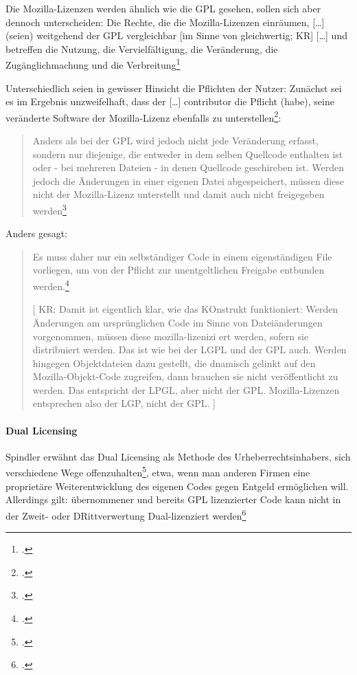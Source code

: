 \documentclass[DIV=calc,BCOR=5mm,11pt,headings=small,oneside,abstract=true, toc=bib]{scrartcl}
\begin{document}
Die Mozilla-Lizenzen werden ähnlich wie die GPL gesehen, sollen sich aber
dennoch unterscheiden: Die Rechte, die die Mozilla-Lizenzen einräumen,
\glqq{}[\ldots] (seien) weitgehend der GPL vergleichbar [im Sinne von
gleichwertig; KR] [\ldots]\grqq{} und betreffen die \glqq{}Nutzung\grqq{},
die \glqq{}Vervielfältigung\grqq{}, die \glqq{}Veränderung\grqq{}, die
\glqq{}Zugänglichmachung\grqq{} und die
\glqq{}Verbreitung\grqq{}\footcite[vgl.][14]{Spindler2004a}

Unterschiedlich seien in gewisser Hinsicht die Pflichten der Nutzer: Zunächst
sei es \glqq{}im Ergebnis unzweifelhaft\grqq{}, dass der \glqq{}[\ldots]
contributor die Pflicht (habe), seine veränderte Software der
Mozilla-Lizenz ebenfalls zu
unterstellen\grqq{}\footcite[vgl.][15]{Spindler2004a}:
\begin{quote}\glqq{}Anders als bei der GPL wird jedoch nicht jede
Veränderung erfasst, sondern nur diejenige, die entweder in dem selben
Quellcode enthalten ist oder - bei mehreren Dateien - in denen Quellcode
geschireben ist. Werden jedoch die Änderungen in einer eigenen Datei
abgespeichert, müssen diese nicht der Mozilla-Lizenz unterstellt und
damit auch nicht freigegeben werden\grqq{}\footcite[][15]{Spindler2004a}
\end{quote}

Anders gesagt:

\begin{quote}\glqq{}Es muss daher nur ein selbständiger Code in einem
eigenständigen File vorliegen, um von der Pflicht zur unentgeltlichen
Freigabe entbunden werden.\grqq{}\footcite[][15]{Spindler2004a}

[ KR: Damit ist eigentlich klar, wie das KOnstrukt funktioniert: Werden
Änderungen am ursprünglichen Code im Sinne von Dateiänderungen vorgenommen,
müssen diese mozilla-lizenizi
ert werden, sofern sie distribuiert werden. Das ist
wie bei der LGPL und der GPL auch. Werden hingegen Objektdateien dazu gestellt,
die dnamisch gelinkt auf den Mozilla-Objekt-Code zugreifen, dann brauchen sie
nicht veröffentlicht zu werden. Das entspricht der LPGL, aber nicht der GPL.
Mozilla-Lizenzen entsprechen also der LGP, nicht der GPL. ]
\end{quote}

\paragraph{Dual Licensing}


Spindler erwähnt das \glqq{}Dual Licensing\grqq{} als Methode des
Urheberrechtsinhabers, sich verschiedene Wege
offenzuhalten\footcite[vgl.][16]{Spindler2004a}, etwa, wenn man anderen Firmen
eine proprietäre Weiterentwicklung des eigenen Codes gegen Entgeld ermöglichen
will. Allerdings gilt: übernommener und bereits GPL lizenzierter Code kann nicht
in der Zweit- oder DRittverwertung Dual-lizenziert
werden\footcite[vgl.][17]{Spindler2004a}
\end{document}
